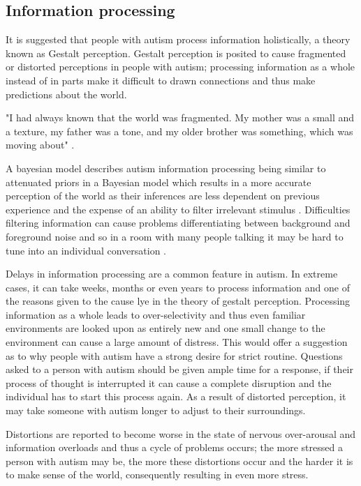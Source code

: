 \documentclass[11pt]{report}
\begin{document}
\subsection{Information processing}

It is suggested that people with autism process information holistically, a theory known as Gestalt perception. Gestalt perception is posited to cause fragmented or distorted perceptions in people with autism\cite{olgab}; processing information as a whole instead of in parts make it difficult to drawn connections and thus make predictions about the world. 

"I had always known that the world was fragmented. My mother was a small and a texture, my father was a tone, and my older brother was something, which was moving about" \cite{williams1992}. 

A bayesian model describes autism information processing being similar to attenuated priors in a Bayesian model which results in a more accurate perception of the world as their inferences are less dependent on previous experience and the expense of an ability to filter irrelevant stimulus \cite{bayes}. Difficulties filtering information can cause problems differentiating between background and foreground noise and so in a room with many people talking it may be hard to tune into an individual conversation \cite{bayes}. 

Delays in information processing are a common feature in autism. In extreme cases, it can take weeks, months or even years to process information and one of the reasons given to the cause lye in the theory of gestalt perception. Processing information as a whole leads to over-selectivity and thus even familiar environments are looked upon as entirely new and one small change to the environment can cause a large amount of distress\cite{olgab}. This would offer a suggestion as to why people with autism have a strong desire for strict routine. Questions asked to a person with autism should be given ample time for a response, if their process of thought is interrupted it can cause a complete disruption and the individual has to start this process again\cite{olgab}. As a result of distorted perception, it may take someone with autism longer to adjust to their surroundings. 

Distortions are reported to become worse in the state of nervous over-arousal and information overloads\cite{olgab} and thus a cycle of problems occurs; the more stressed a person with autism may be, the more these distortions occur and the harder it is to make sense of the world, consequently resulting in even more stress.
\end{document}
